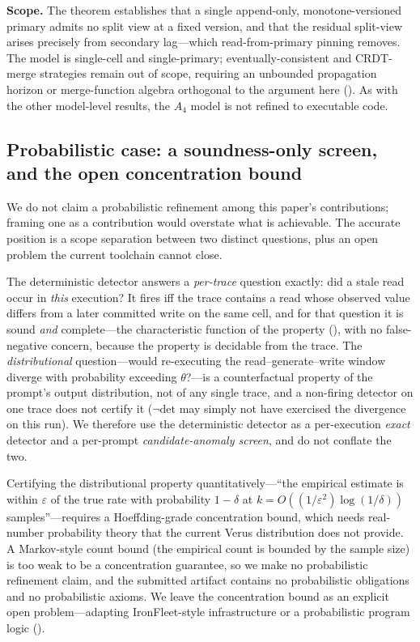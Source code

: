 \documentclass[journal,compsoc,10pt]{IEEEtran}
\providecommand{\citep}{\cite}
\theoremstyle{definition}
\theoremstyle{remark}
\begin{document}
\medskip
\noindent\textbf{Scope.}
The theorem establishes that a single append-only, monotone-versioned primary
admits no split view at a fixed version, and that the residual split-view
arises precisely from secondary lag---which read-from-primary pinning
removes. The model is single-cell and single-primary; eventually-consistent
and CRDT-merge strategies remain out of scope, requiring an unbounded
propagation horizon or merge-function algebra orthogonal to the argument here
(). As with the other model-level results, the
$A_4$ model is not refined to executable code.

\subsection{Probabilistic case: a soundness-only screen, and the open concentration bound}
\label{sec:probabilistic-v2}

We do not claim a probabilistic refinement among this paper's contributions;
framing one as a contribution would overstate what is achievable. The accurate
position is a scope separation between two distinct questions, plus an open
problem the current toolchain cannot close.

The deterministic detector answers a \emph{per-trace} question exactly: did a
stale read occur in \emph{this} execution? It fires iff the trace contains a
read whose observed value differs from a later committed write on the same
cell, and for that question it is sound \emph{and} complete---the
characteristic function of the property (), with
no false-negative concern, because the property is decidable from the trace.
The \emph{distributional} question---would re-executing the
read--generate--write window diverge with probability exceeding
$\theta$?---is a counterfactual property of the prompt's output distribution,
not of any single trace, and a non-firing detector on one trace does not
certify it ($\neg\mathrm{det}$ may simply not have exercised the divergence on
this run). We therefore use the deterministic detector as a per-execution
\emph{exact} detector and a per-prompt \emph{candidate-anomaly screen}, and do
not conflate the two.

Certifying the distributional property quantitatively---``the empirical
estimate is within $\varepsilon$ of the true rate with probability
$1-\delta$ at $k = O((1/\varepsilon^2)\log(1/\delta))$ samples''---requires a
Hoeffding-grade concentration bound, which needs real-number probability
theory that the current Verus distribution does not provide. A Markov-style count bound (the empirical count is bounded
by the sample size) is too weak to be a concentration guarantee, so we make no
probabilistic refinement claim, and the submitted artifact contains no
probabilistic obligations and no probabilistic axioms. We leave the
concentration bound as an explicit open problem---adapting IronFleet-style
infrastructure
\citep{HawblitzelEtAl2015IronFleet} or a probabilistic program logic
().
\end{document}

